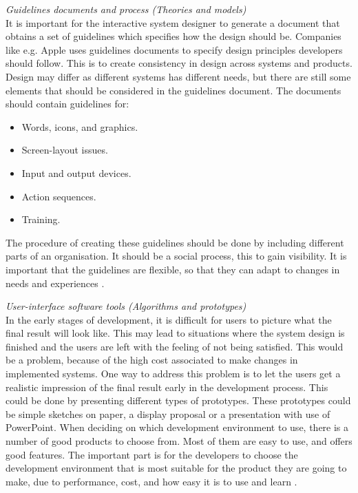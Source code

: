 \emph{Guidelines documents and process (Theories and models)}\\
It is important for the interactive system designer to generate a document that obtains a set of guidelines which specifies how the design should be. Companies like e.g. Apple uses guidelines documents to specify design principles developers should follow. This is to create consistency in design across systems and products. Design may differ as different systems has different needs, but there are still some elements that should be considered in the guidelines document. The documents should contain guidelines for:

\begin{itemize}
\renewcommand{\labelitemi}{$\bullet$}
\item Words, icons, and graphics.
\item Screen-layout issues.
\item Input and output devices.
\item Action sequences.
\item Training.
\end{itemize}

The procedure of creating these guidelines should be done by including different parts of an organisation. It should be a social process, this to gain visibility. It is important that the guidelines are flexible, so that they can adapt to changes in needs and experiences \cite{mmi}. 

\emph{User-interface software tools (Algorithms and prototypes)}\\
In the early stages of development, it is difficult for users to picture what the final result will look like. This may lead to situations where the system design is finished and the users are left with the feeling of not being satisfied. This would be a problem, because of the high cost associated to make changes in implemented systems. One way to address this problem is to let the users get a realistic impression of the final result early in the development process. This could be done by presenting different types of prototypes. These prototypes could be simple sketches on paper, a display proposal or a presentation with use of PowerPoint. 
When deciding on which development environment to use, there is a number of good products to choose from. Most of them are easy to use, and offers good features. The important part is for the developers to choose the development environment that is most suitable for the product they are going to make, due to performance, cost, and how easy it is to use and learn \cite{mmi}.
	
